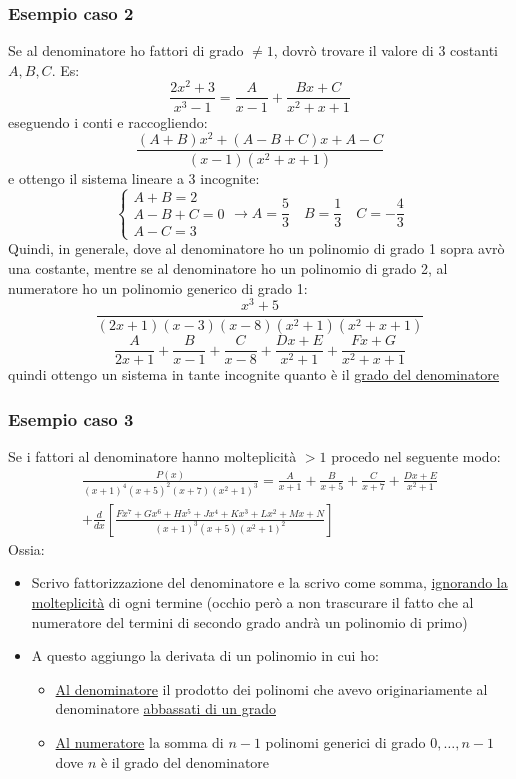 \subsubsection*{Esempio caso 2}
Se al denominatore ho fattori di grado $ \neq 1$, dovrò trovare il valore di 3 costanti $ A, B, C $. Es:
\[
	\frac{2x^2 + 3}{x^3 - 1}= \frac{A}{x-1} + \frac{Bx + C}{x^2 + x +1}
\]
eseguendo i conti e raccogliendo:
\[
	\frac{\left( A + B \right) x^2 + \left( A- B + C \right) x + A - C}{\left( x-1 \right) \left( x^2 + x+1 \right) }
\]
e ottengo il sistema lineare a 3 incognite:
\[
	\begin{cases}
		A + B = 2    \\
		A - B + C =0 \\
		A - C = 3
	\end{cases}
	\rightarrow A= \frac{5}{3} \quad B = \frac{1}{3} \quad C = - \frac{4}{3}
\]
Quindi, in generale, dove al denominatore ho un polinomio di grado 1 sopra avrò una costante, mentre se al denominatore ho un polinomio di grado 2, al numeratore ho un polinomio generico di grado 1:
\[
	\frac{x^3 + 5}{\left( 2x + 1 \right) \left( x-3 \right) \left( x-8 \right) \left( x^2+1 \right) \left( x^2 + x +1 \right) }
\]
\[
	\frac{A}{2x+1} + \frac{B}{x-1} + \frac{C}{x-8} + \frac{Dx + E}{x^2+1}+\frac{Fx + G}{x^2 + x +1}
\]
quindi ottengo un sistema in tante incognite quanto è il \underline{grado del denominatore}
\hr
\subsubsection*{Esempio caso 3}
Se i fattori al denominatore hanno molteplicità $ > 1$ procedo nel seguente modo:
\begin{multline*}
	\frac{P\left( x \right) }{\left( x+1 \right) ^{4} \left( x+5 \right) ^2\left( x+7 \right) \left( x^2 +1 \right) ^3} =\frac{A}{x+1} + \frac{B}{x+5} + \frac{C}{x+7}+ \frac{Dx + E}{x^2+1} \\ + \frac{d}{dx}\left[ \frac{F x ^{7 }+ G x ^{6} + H x^{5}+ J x^{4}+ K x^3 + L x^2 + Mx + N}{\left( x+1 \right) ^3 \left( x+5 \right) \left( x^2 + 1 \right) ^2} \right]
\end{multline*}
Ossia:
\begin{itemize}
	\item Scrivo fattorizzazione del denominatore e la scrivo come somma, \underline{ignorando la molteplicità} di ogni termine (occhio però a non trascurare il fatto che al numeratore del termini di secondo grado andrà un polinomio di primo)
	\item A questo aggiungo la derivata di un polinomio in cui ho:
	      \begin{itemize}
		      \item \underline{Al denominatore} il prodotto dei polinomi che avevo originariamente al denominatore \underline{abbassati di un grado}
		      \item \underline{Al numeratore} la somma di $ n-1 $ polinomi generici di grado $ 0,\ldots, n-1 $ dove $ n $ è il grado del denominatore
	      \end{itemize}
\end{itemize}
